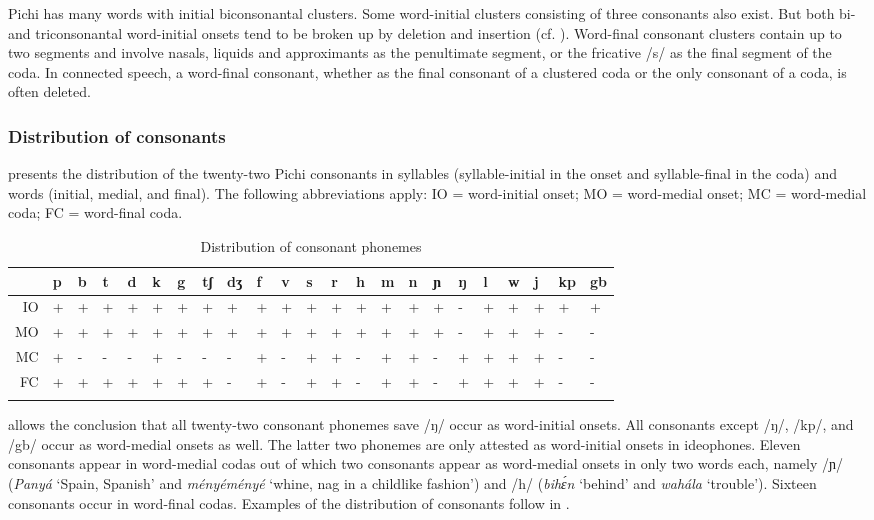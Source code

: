 Pichi has many words with initial biconsonantal clusters. Some word-initial clusters consisting of three consonants also exist. But both bi- and triconsonantal word-initial onsets tend to be broken up by deletion and insertion (cf. ). Word-final consonant clusters contain up to two segments and involve nasals, liquids and approximants as the penultimate segment, or the fricative /s/ as the final segment of the coda. In connected speech, a word-final consonant, whether as the final consonant of a clustered coda or the only consonant of a coda, is often deleted. 


\subsubsection{Distribution of consonants}\label{sec:2.6.2.1}
 presents the distribution of the twenty-two Pichi consonants in syllables (syllable-initial in the onset and syllable-final in the coda) and words (initial, medial, and final). The following abbreviations apply: IO = word-initial onset; MO = word-medial onset; MC = word-medial coda; FC = word-final coda.

\begin{table}
\caption{Distribution of consonant phonemes}
\label{tab:key:2.5}

\begin{tabularx}{\textwidth}{rXXXXXXXXXXXXXXXXXXXXXX}
\lsptoprule
 & p & b & t & d & k & g & tʃ & dʒ & f & v & s & r & h & m & n & ɲ & ŋ & l & w & j & kp & gb\\
\midrule
\MakeUppercase{io} & + & + & + & + & + & + & + & + & + & + & + & + & + & + & + & + & {}- & + & + & + & + & +\\
\MakeUppercase{mo} & + & + & + & + & + & + & + & + & + & + & + & + & + & + & + & + & {}- & + & + & + & {}- & {}-\\
\MakeUppercase{mc} & + & {}- & {}- & {}- & + & {}- & {}- & {}- & + & {}- & + & + & {}- & + & + & {}- & + & + & + & + & {}- & {}-\\
\MakeUppercase{fc} & + & + & + & + & + & + & + & {}- & + & {}- & + & + & {}- & + & + & {}- & + & + & + & + & {}- & {}-\\
\lspbottomrule
\end{tabularx}
\end{table}

 allows the conclusion that all twenty-two consonant phonemes save /ŋ/ occur as word-initial onsets. All consonants except /ŋ/, /kp/, and /gb/ occur as word-medial onsets as well. The latter two phonemes are only attested as word-initial onsets in ideophones. Eleven consonants appear in word-medial codas out of which two consonants appear as word-medial onsets in only two words each, namely /ɲ/ (\textit{Panyá} ‘Spain, Spanish’ and \textit{ményéményé} ‘whine, nag in a childlike fashion’) and /h/ (\textit{bihɛ́n} ‘behind’ and \textit{wahála} ‘trouble’). Sixteen consonants occur in word-final codas. Examples of the distribution of consonants follow in .

